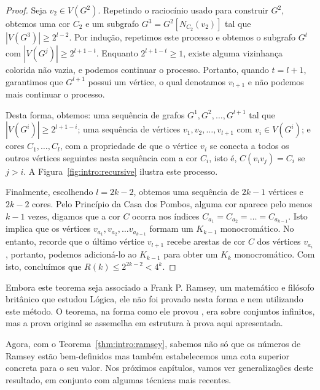 \begin{proof}
Seja $v_2 \in V(G^2)$. Repetindo o raciocínio usado para construir $G^2$, obtemos uma cor $C_2$ e um subgrafo $G^3 = G^2[N_{C_2}(v_2)]$ tal que $|V(G^3)| \geq 2^{l-2}$. Por indução, repetimos este processo e obtemos o subgrafo $G^t$ com $|V(G^j)| \geq 2^{l+1-t}$. Enquanto $2^{l+1-t} \geq 1$, existe alguma vizinhança colorida não vazia, e podemos continuar o processo. Portanto, quando $t = l+1$, garantimos que $G^{l+1}$ possui um vértice, o qual denotamos $v_{l+1}$ e não podemos mais continuar o processo.

Desta forma, obtemos: uma sequência de grafos $G^1, G^2, \dots, G^{l+1}$ tal que $|V(G^i)| \geq 2^{l+1-i}$; uma sequência de vértices $v_1, v_2, \dots, v_{l+1}$ com $v_i \in V(G^i)$; e cores $C_1, \dots, C_l$, com a propriedade de que o vértice $v_i$ se conecta a todos os outros vértices seguintes nesta sequência com a cor $C_i$, isto é, $C(v_i v_j) = C_i$ se $j > i$. A Figura~\ref{fig:intro:recursive} ilustra este processo.

Finalmente, escolhendo $l = 2k - 2$, obtemos uma sequência de $2k - 1$ vértices e $2k - 2$ cores. Pelo Princípio da Casa dos Pombos, alguma cor aparece pelo menos $k - 1$ vezes, digamos que a cor $C$ ocorra nos índices $C_{a_1} =  C_{a_2} = \dots = C_{a_{k-1}}$. Isto implica que os vértices $v_{a_1}, v_{a_2}, \dots v_{a_{k-1}}$ formam um $K_{k-1}$ monocromático.
No entanto, recorde que o último vértice $v_{l+1}$ recebe arestas de cor $C$ dos vértices $v_{a_{i}}$, portanto, podemos adicioná-lo ao $K_{k-1}$ para obter um $K_k$ monocromático. Com isto, concluímos que $R(k) \leq 2^{2k - 2} < 4^k$.
\end{proof}

Embora este teorema seja associado a Frank P. Ramsey, um matemático e filósofo britânico que estudou Lógica, ele não foi provado nesta forma e nem utilizando este método. O teorema, na forma como ele provou \cite{ramsey}, era sobre conjuntos infinitos, mas a prova original se assemelha em estrutura à prova aqui apresentada.

Agora, com o Teorema~\ref{thm:intro:ramsey}, sabemos não só que os números de Ramsey estão bem-definidos mas também estabelecemos uma cota superior concreta para o seu valor. Nos próximos capítulos, vamos ver generalizações deste resultado, em conjunto com algumas técnicas mais recentes.

